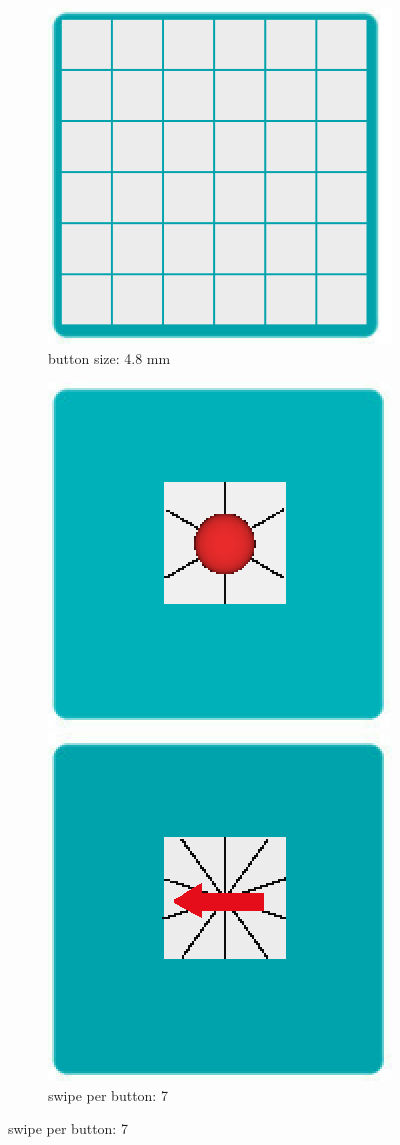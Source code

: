 \begin{figure}
\begin{subfigure}{.24\textwidth}
  \caption{button size: 7.1 mm}
  \label{fig:f3c}
  \includegraphics[width=.7\linewidth]{figures/F3-4.png}
  \caption{button size: 4.8 mm}
  \label{fig:f3d}
\end{subfigure}
\begin{subfigure}{.24\textwidth}
  \centering
  \includegraphics[width=.7\linewidth]{figures/F3-5.png}
  \caption{swipe per button: 7}
  \label{fig:f3e}
  \includegraphics[width=.7\linewidth]{figures/F3-6.png}

\end{subfigure}
\end{figure}
